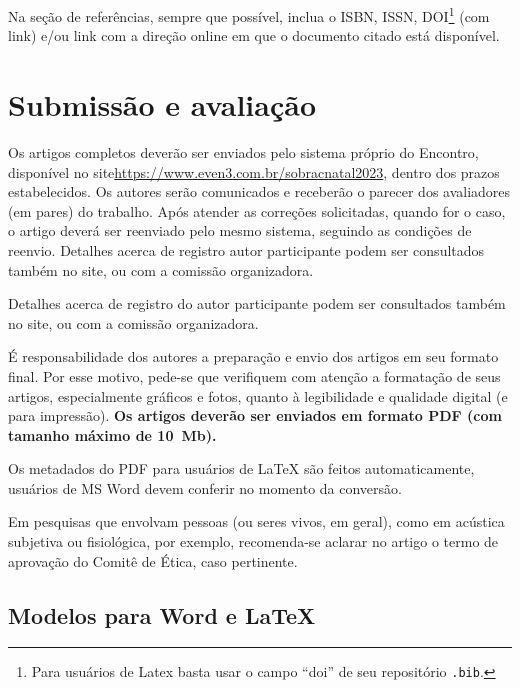 Na seção de referências, sempre que possível, inclua o ISBN, ISSN, DOI\footnote{Para usuários de Latex basta usar o campo ``doi'' de seu repositório \texttt{.bib}.} (com link) e/ou link com a direção online em que o documento citado está disponível.

\section{Submissão e avaliação}

Os artigos completos deverão ser enviados pelo sistema próprio do Encontro, disponível no site\linebreak \url{https://www.even3.com.br/sobracnatal2023}, dentro dos prazos estabelecidos. Os autores serão comunicados e receberão o parecer dos avaliadores (em pares) do trabalho. Após atender as correções solicitadas, quando for o caso, o artigo deverá ser reenviado pelo mesmo sistema, seguindo as condições de reenvio. Detalhes acerca de registro autor participante podem ser consultados também no site, ou com a comissão organizadora.

Detalhes acerca de registro do autor participante podem ser consultados também no site, ou com a comissão organizadora.

É responsabilidade dos autores a preparação e envio dos artigos em seu formato final. Por esse motivo, pede-se que verifiquem com atenção a formatação de seus artigos, especialmente gráficos e fotos, quanto à legibilidade e qualidade digital (e para impressão). \textbf{Os artigos deverão ser enviados em formato PDF (com tamanho máximo de 10~Mb).} 

Os metadados do PDF para usuários de \LaTeX\xspace são feitos automaticamente, usuários de MS Word devem conferir no momento da conversão.


Em pesquisas que envolvam pessoas (ou seres vivos, em geral), como em acústica subjetiva ou fisiológica, por exemplo, recomenda-se aclarar no artigo o termo de aprovação do Comitê de Ética, caso pertinente.



\subsection{Modelos para Word e \LaTeX}

